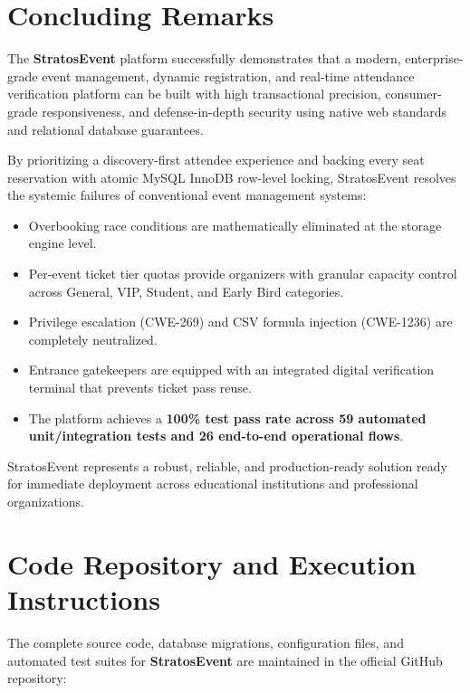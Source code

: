 \documentclass[11pt,a4paper]{report}
\begin{document}
\section{Concluding Remarks}
\justifying
The \textbf{StratosEvent} platform successfully demonstrates that a modern, enterprise-grade event management, dynamic registration, and real-time attendance verification platform can be built with high transactional precision, consumer-grade responsiveness, and defense-in-depth security using native web standards and relational database guarantees.

By prioritizing a discovery-first attendee experience and backing every seat reservation with atomic MySQL InnoDB row-level locking, StratosEvent resolves the systemic failures of conventional event management systems:
\begin{itemize}[leftmargin=1.5em, itemsep=0.3em]
    \item Overbooking race conditions are mathematically eliminated at the storage engine level.
    \item Per-event ticket tier quotas provide organizers with granular capacity control across General, VIP, Student, and Early Bird categories.
    \item Privilege escalation (CWE-269) and CSV formula injection (CWE-1236) are completely neutralized.
    \item Entrance gatekeepers are equipped with an integrated digital verification terminal that prevents ticket pass reuse.
    \item The platform achieves a \textbf{100\% test pass rate across 59 automated unit/integration tests and 26 end-to-end operational flows}.
\end{itemize}

StratosEvent represents a robust, reliable, and production-ready solution ready for immediate deployment across educational institutions and professional organizations.

\section{Code Repository and Execution Instructions}
\justifying
The complete source code, database migrations, configuration files, and automated test suites for \textbf{StratosEvent} are maintained in the official GitHub repository:

\begin{center}
\begingroup
\setlength{\fboxsep}{12pt}
\noindent{}
\endgroup
\end{center}
\end{document}
